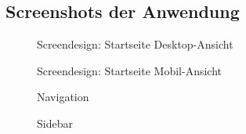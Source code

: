 \subsection{Screenshots der Anwendung}
\label{Screenshots}

\begin{figure}[h]
\centering
{}
\caption{Screendesign: Startseite Desktop-Ansicht}
\end{figure}


\begin{figure}[h]
\centering
{}
\caption{Screendesign: Startseite Mobil-Ansicht}
\end{figure}

\begin{figure}[h]
\centering
{}
\caption{Navigation}
\end{figure}

\begin{figure}[h]
\centering
{}
\caption{Sidebar}
\end{figure}

\clearpage
